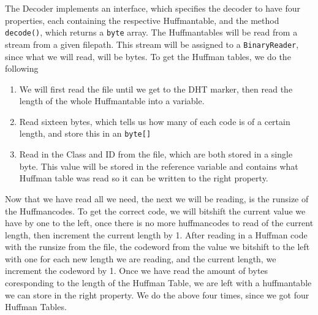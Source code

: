 The Decoder implements an interface, which specifies the decoder to have four properties, each containing the respective Huffmantable, and the method \lstinline|decode()|, which returns a \lstinline|byte| array. 
The Huffmantables will be read from a stream from a given filepath. This stream will be assigned to a \lstinline|BinaryReader|, since what we will read, will be bytes. 
To get the Huffman tables, we do the following
\begin{enumerate}
\item We will first read the file until we get to the DHT marker, then read the length of the whole Huffmantable into a variable.
\item Read sixteen bytes, which tells us how many of each code is of a certain length, and store this in an \lstinline|byte[]|
\item Read in the Class and ID from the file, which are both stored in a single byte. This value will be stored in the reference variable and contains what Huffman table was read so it can be written to the right property.
\end{enumerate}
Now that we have read all we need, the next we will be reading, is the runsize of the Huffmancodes. To get the correct code, we will bitshift the current value we have by one to the left, once there is no more huffmancodes to read of the current length, then increment the current length by 1.
After reading in a Huffman code with the runsize from the file, the codeword from the value we bitshift to the left with one for each new length we are reading, and the current length, we increment the codeword by 1.
Once we have read the amount of bytes coresponding to the length of the Huffman Table, we are left with a huffmantable we can store in the right property.
We do the above four times, since we got four Huffman Tables.

